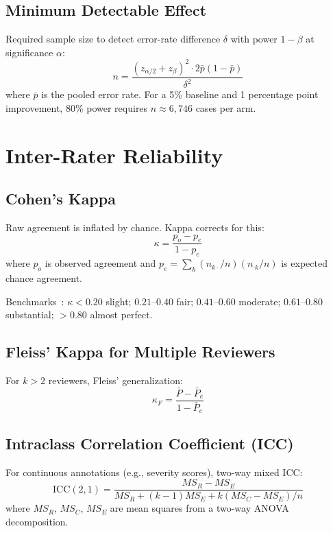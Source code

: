 \subsection{Minimum Detectable Effect}

Required sample size to detect error-rate difference $\delta$ with power $1-\beta$ at significance $\alpha$:
\[
n = \frac{(z_{\alpha/2} + z_\beta)^2 \cdot 2\bar{p}(1-\bar{p})}{\delta^2}
\]
where $\bar{p}$ is the pooled error rate. For a 5\% baseline and 1 percentage point improvement, 80\% power requires $n \approx 6{,}746$ cases per arm.

\section{Inter-Rater Reliability}

\subsection{Cohen's Kappa}

Raw agreement is inflated by chance. Kappa corrects for this:
\[
\kappa = \frac{p_o - p_e}{1 - p_e}
\]
where $p_o$ is observed agreement and $p_e = \sum_k (n_{k\cdot}/n)(n_{\cdot k}/n)$ is expected chance agreement.

Benchmarks~\autocite{landis1977kappa}: $\kappa < 0.20$ slight; $0.21$--$0.40$ fair; $0.41$--$0.60$ moderate; $0.61$--$0.80$ substantial; ${>}0.80$ almost perfect.

\subsection{Fleiss' Kappa for Multiple Reviewers}

For $k > 2$ reviewers, Fleiss' generalization:
\[
\kappa_F = \frac{\bar{P} - \bar{P}_e}{1 - \bar{P}_e}
\]

\subsection{Intraclass Correlation Coefficient (ICC)}

For continuous annotations (e.g., severity scores), two-way mixed ICC:
\[
\text{ICC}(2,1) = \frac{MS_R - MS_E}{MS_R + (k-1)MS_E + k(MS_C - MS_E)/n}
\]
where $MS_R$, $MS_C$, $MS_E$ are mean squares from a two-way ANOVA decomposition.

